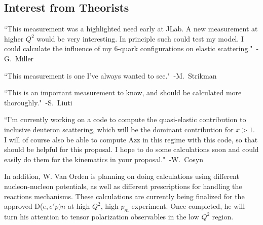 \subsection{Interest from Theorists}

``This measurement was a highlighted need early at JLab. A new measurement at higher $Q^2$ would be very interesting. In principle such could test my model. I could calculate the influence of my 6-quark configurations on elastic scattering."~-G.~Miller

``This measurement is one I've always wanted to see."~-M.~Strikman

``This is an important measurement to know, and should be calculated more thoroughly."~-S.~Liuti

``I'm currently working on a code to compute the quasi-elastic  contribution to inclusive deuteron scattering, which will be the dominant contribution for $x > 1$.  I will of course also be able to compute Azz in this regime with this 
code, so that should be helpful for this proposal. I hope to do some 
calculations soon and could easily do them for the kinematics in your 
proposal."~-W.~Cosyn


In addition, W. Van Orden is planning on doing calculations using different nucleon-nucleon potentials, as well as different prescriptions for handling the reactions mechanisms.   These calculations are currently being finalized for the approved
D($e,e'p)n$ at high $Q^2$, high $p_m$ experiment. Once completed, he will turn his attention to tensor polarization observables in the low $Q^2$ region.